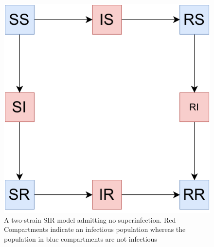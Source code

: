 \documentclass{article}
\theoremstyle{definition}
\begin{document}
\FloatBarrier
\begin{figure}
    \centering
    \includegraphics[width=\textwidth]{images_pdf/Two_strain_SIR_no_super.pdf}
    \caption{A two-strain SIR model admitting no superinfection. Red Compartments indicate an infectious population whereas the population in blue compartments are not infectious}
    \label{fig:ms_ns_2d}
\end{figure}
\end{document}
